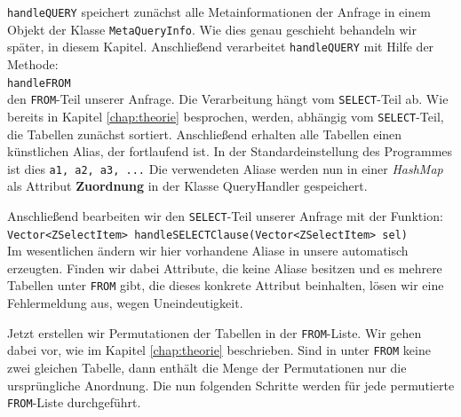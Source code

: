 \verb|handleQUERY| speichert zunächst alle Metainformationen der Anfrage in einem Objekt der Klasse \verb|MetaQueryInfo|. Wie dies genau geschieht behandeln wir später, in diesem Kapitel. Anschließend verarbeitet \verb|handleQUERY| mit Hilfe der Methode:\\
\verb|handleFROM|\\
den \verb|FROM|-Teil unserer Anfrage. Die Verarbeitung hängt vom \verb|SELECT|-Teil ab. Wie bereits in Kapitel \ref{chap:theorie} besprochen, werden, abhängig vom \verb|SELECT|-Teil, die Tabellen zunächst sortiert. Anschließend erhalten alle Tabellen einen künstlichen Alias, der fortlaufend ist. In der Standardeinstellung des Programmes ist dies \verb|a1, a2, a3, ...| Die verwendeten Aliase werden nun in einer \textit{HashMap} als Attribut \textbf{Zuordnung} in der Klasse QueryHandler gespeichert. 

Anschließend bearbeiten wir den \verb|SELECT|-Teil unserer Anfrage mit der Funktion:\\
\verb|Vector<ZSelectItem> handleSELECTClause(Vector<ZSelectItem> sel)|\\
Im wesentlichen ändern wir hier vorhandene Aliase in unsere automatisch erzeugten. Finden wir dabei Attribute, die keine Aliase besitzen und es mehrere Tabellen unter \verb|FROM| gibt, die dieses konkrete Attribut beinhalten, lösen wir eine Fehlermeldung aus, wegen Uneindeutigkeit.

Jetzt erstellen wir Permutationen der Tabellen in der \verb|FROM|-Liste. Wir gehen dabei vor, wie im Kapitel \ref{chap:theorie} beschrieben. Sind in unter \verb|FROM| keine zwei gleichen Tabelle, dann enthält die Menge der Permutationen nur die ursprüngliche Anordnung. Die nun folgenden Schritte werden für jede permutierte \verb|FROM|-Liste durchgeführt.

